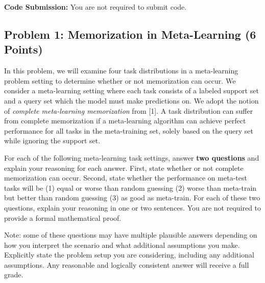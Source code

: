 \documentclass[12pt]{article}
\begin{document}
\textbf{Code Submission:} You are not required to submit code.


\subsection*{Problem 1: Memorization in Meta-Learning (6 Points)}
In this problem, we will examine four task distributions in a meta-learning problem setting to determine whether or not memorization can occur.
We consider a meta-learning setting where each task consists of a labeled support set and a query set which the model must make predictions on.
We adopt the notion of \textit{complete meta-learning memorization} from [1].
A task distribution can suffer from complete memorization if a meta-learning algorithm can achieve perfect performance for all tasks in the meta-training set, solely based on the query set while ignoring the support set.

For each of the following meta-learning task settings, answer \textbf{two questions} and explain your reasoning for each answer.
First, state whether or not complete memorization can occur.
Second, state whether the performance on meta-test tasks will be (1) equal or worse than random guessing (2) worse than meta-train but better than random guessing (3) as good as meta-train.
For each of these two questions, explain your reasoning in one or two sentences.
You are not required to provide a formal mathematical proof.

{
\color{gray}
Note: some of these questions may have multiple plausible answers depending on how you interpret the scenario and what additional assumptions you make.
Explicitly state the problem setup you are considering, including any additional assumptions.
Any reasonable and logically consistent answer will receive a full grade.
}
\end{document}
